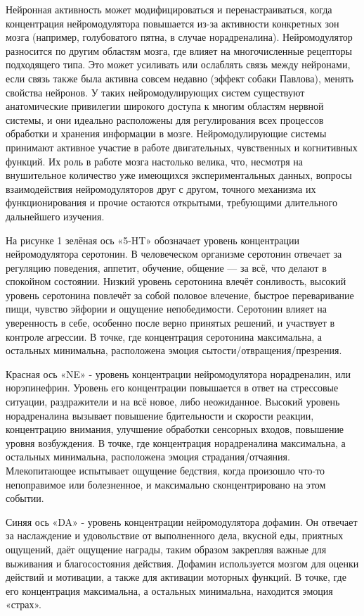 Нейронная активность может модифицироваться и перенастраиваться, когда концентрация нейромодулятора повышается из-за активности конкретных зон мозга (например, голубоватого пятна, в случае норадреналина). Нейромодулятор разносится по другим областям мозга, где влияет на многочисленные рецепторы подходящего типа. Это может усиливать или ослаблять связь между нейронами, если связь также была активна совсем недавно (эффект собаки Павлова), менять свойства нейронов.\cite{parsingreward} У таких нейромодулирующих систем существуют анатомические привилегии широкого доступа к многим областям нервной системы, и они идеально расположены для регулирования всех процессов обработки и хранения информации в мозге. Нейромодулирующие системы принимают активное участие в работе двигательных, чувственных и когнитивных функций.\cite{zarrindast} Их роль в работе мозга настолько велика, что, несмотря на внушительное количество уже имеющихся экспериментальных данных, вопросы взаимодействия нейромодуляторов друг с другом, точного механизма их функционирования и прочие остаются открытыми, требующими длительного дальнейшего изучения.


На рисунке 1 зелёная ось «5-HT» обозначает уровень концентрации нейромодулятора серотонин. В человеческом организме серотонин отвечает за регуляцию поведения, аппетит, обучение, общение — за всё, что делают в спокойном состоянии. Низкий уровень серотонина влечёт сонливость, высокий уровень серотонина повлечёт за собой половое влечение,  быстрое переваривание пищи, чувство эйфории и ощущение непобедимости. Серотонин влияет на уверенность в себе, особенно после верно принятых решений, и участвует в контроле агрессии. В точке, где концентрация серотонина максимальна, а остальных минимальна, расположена эмоция сытости/отвращения/презрения.


Красная ось «NE» - уровень концентрации нейромодулятора норадреналин, или норэпинефрин. Уровень его концентрации повышается в ответ на стрессовые ситуации, раздражители и на всё новое, либо неожиданное. Высокий уровень норадреналина вызывает повышение бдительности и скорости реакции, концентрацию внимания, улучшение обработки сенсорных входов, повышение уровня возбуждения. В точке, где концентрация норадреналина максимальна, а остальных минимальна, расположена эмоция страдания/отчаяния. Млекопитающее испытывает ощущение бедствия, когда произошло что-то непоправимое или болезненное, и максимально сконцентрировано на этом событии.


Синяя ось «DA» - уровень концентрации нейромодулятора дофамин. Он отвечает за наслаждение и удовольствие от выполненного дела, вкусной еды, приятных ощущений, даёт ощущение награды, таким образом закрепляя важные для выживания и благосостояния действия. Дофамин используется мозгом для оценки действий и мотивации, а также для активации моторных функций. В точке, где его концентрация максимальна, а остальных минимальна, находится эмоция «страх».


